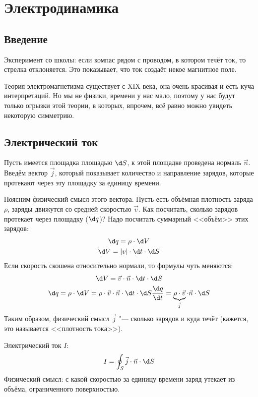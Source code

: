 \chapter{Электродинамика}

\section{Введение}
	Эксперимент со школы: если компас рядом с проводом, в котором течёт ток, то стрелка отклоняется.
	Это показывает, что ток создаёт некое магнитное поле.

	Теория электромагнетизма существует с XIX века, она очень красивая и есть куча интерпретаций.
	Но мы не физики, времени у нас мало, поэтому у нас будут только огрызки этой теории, в которых,
	впрочем, всё равно можно увидеть некоторую симметрию.

\section{Электрический ток}
	Пусть имеется площадка площадью $\d S$, к этой площадке проведена нормаль $\vec n$.
	Введём вектор $\vec j$, который показывает количество и направление зарядов,
	которые протекают через эту площадку за единицу времени.

	Поясним физический смысл этого вектора.
	Пусть есть объёмная плотность заряда $\rho$, заряды движутся со средней скоростью $\vec v$.
	Как посчитать, сколько зарядов протекает через площадку ($\d q$)?
	Надо посчитать суммарный <<объём>> этих зарядов:
	\begin{gather*}
		\d q = \rho \cdot \d V \\
		\d V = |v| \cdot \d t \cdot \d S
	\end{gather*}
	Если скорость скошена относительно нормали, то формулы чуть меняются:
	\begin{gather*}
		\d V = \vec v \cdot \vec n \cdot \d t \cdot \d S \\
		\d q = \rho \cdot \d V = \rho \cdot \vec v \cdot \vec n \cdot \d t \cdot \d S
		\frac{\d q}{\d t} = \underbrace{\rho \cdot \vec v}_{\vec j} \cdot \vec n \cdot \d S
	\end{gather*}
	Таким образом, физический смысл $\vec j$ "--- сколько зарядов и куда течёт (кажется, это называется <<плотность тока>>).

	\begin{Def}
		Электрический ток $I$:
		\[ I = \oint_S \vec j \cdot \vec n \cdot \d S\]
		Физический смысл: с какой скоростью за единицу времени заряд утекает из объёма, ограниченного поверхностью.
	\end{Def}

